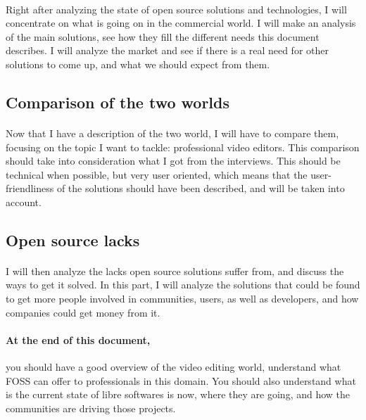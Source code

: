        \paragraph{}
            Right after analyzing the state of open source solutions and
            technologies, I will concentrate on what is going on in the commercial
            world. I will make an analysis of the main solutions, see how they
            fill the different needs this document describes. I will analyze the
            market and see if there is a real need for other solutions to come
            up, and what we should expect from them.

    \subsection{Comparison of the two worlds}
        \paragraph {}
            Now that I have a description of the two world, I will have to compare
            them, focusing on the topic I want to tackle: professional video
            editors. This comparison should take into consideration what I got from
            the interviews. This should be technical when possible, but very user
            oriented, which means that the user-friendliness of the solutions should have
            been described, and will be taken into account.

    \subsection{Open source lacks}
        \paragraph{}
            I will then analyze the lacks open source solutions suffer from,
            and discuss the ways to get it solved. In this part, I will analyze
            the solutions that could be found to get more people involved in
            communities, users, as well as developers, and how companies could get
            money from it.

    \paragraph{At the end of this document,} you should have a good
        overview of the video editing world, understand what FOSS can offer to
        professionals in this domain. You should also understand what is the
        current state of libre softwares is now, where they are going, and how
        the communities are driving those projects.
